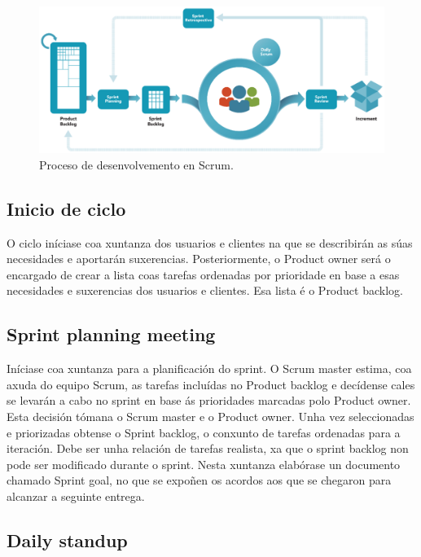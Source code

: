 \begin{figure}[tbh]
	\begin{center}
		\includegraphics[width=1\textwidth]{figures/scrum}
		\caption{Proceso de desenvolvemento en Scrum.}
		\label{fig:scrum}
	\end{center}
\end{figure}

\subsection{Inicio de ciclo}

O ciclo iníciase coa xuntanza dos usuarios e clientes na que se describirán as súas necesidades e aportarán suxerencias. Posteriormente, o Product owner será o encargado de crear a lista coas tarefas ordenadas por prioridade en base a esas necesidades e suxerencias dos usuarios e clientes. Esa lista é o Product backlog.

\subsection{Sprint planning meeting}

Iníciase coa xuntanza para a planificación do sprint. O Scrum master estima, coa axuda do equipo Scrum, as tarefas incluídas no Product backlog e decídense cales se levarán a cabo no sprint en base ás prioridades marcadas polo Product owner. Esta decisión tómana o Scrum master e o Product owner. Unha vez seleccionadas e priorizadas obtense o Sprint backlog, o conxunto de tarefas ordenadas para a iteración. Debe ser unha relación de tarefas realista, xa que o sprint backlog non pode ser modificado durante o sprint.
Nesta xuntanza elabórase un documento chamado Sprint goal, no que se expoñen os acordos aos que se chegaron para alcanzar a seguinte entrega.

\subsection{Daily standup}

